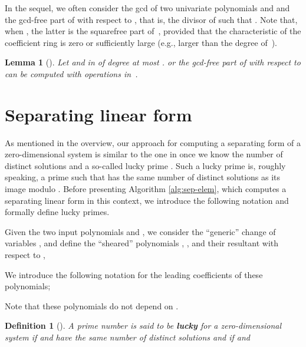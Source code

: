 \documentclass{sig-alternate}
\newtheorem{definition}[theorem]{Definition}
\newtheorem{lemma}[theorem]{Lemma}
\newcommand{\blue}[1]{\color{blue}#1\color{black}\xspace}
\renewcommand{\blue}[1]{#1\xspace}
\begin{document}
In the sequel, we often consider the gcd of two univariate polynomials  and
 and the gcd-free part of  with respect to , that is, the divisor 
of  such that . Note that, when ,  the latter is the
squarefree part of~, \blue{provided that the characteristic of the
  coefficient ring is zero or sufficiently large (e.g., larger than the degree of~)}. 

\begin{lemma}[{\cite[Rem. 10.19]{BPR06}}]
\label{complexity:gcd}
  Let  and  in  of degree at most . 
or the gcd-free part of  with respect to  can be computed with
   operations in~.
\end{lemma}




\section{Separating linear form}
\label{sec:sep-form}


As mentioned in the overview, our approach for computing a separating form of a zero-dimensional
system    is similar to the one
in \blue{\cite{bouzidiJSC2014a}} \blue{once we know} the number of distinct solutions and a
so-called lucky prime . \blue{Such a  lucky prime} is, roughly speaking, a prime such
that  \blue{has} the same number of distinct solutions as its 
\blue{image modulo .}
Before presenting Algorithm \ref{alg:sep-elem}, \blue{which computes a separating linear form in
this context,} we introduce  the following notation and  formally define lucky primes.







Given the two input polynomials  and , 
we  consider the ``generic'' change of variables , and define the
 ``sheared'' polynomials , ,
 and their resultant with respect to , 

We introduce the following notation for the leading coefficients of these polynomials; 

Note that these polynomials do not depend on .



\begin{definition}[{\cite[Def. 8]{bouzidiJSC2014a}}]\label{def:lucky-nb-roots}
 A prime number  is said to be {\em \bf lucky} for a zero-dimensional system   if
  and  have the same  number of distinct 
solutions and if    and

\end{definition}
\end{document}
